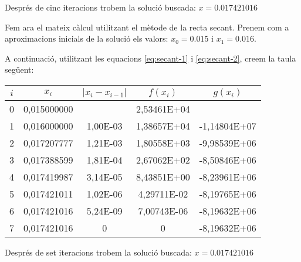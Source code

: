 \begin{exemple}
Després de cinc iteracions trobem la solució buscada: $x=\num{0,017421016}$

Fem ara el mateix càlcul utilitzant el mètode de la recta secant. Prenem com a  aproximacions inicials de la solució els valors: $x_0 = \num{0,015}$ i $x_1 = \num{0,016}$.

 A continuació, utilitzant les equacions \eqref{eq:secant-1} i \eqref{eq:secant-2}, creem la taula següent:

\begin{center}
   \centering
   \begin{tabular}{S[table-format=1.0]S[table-format=2.9]S[table-format=2.2e+2]
   S[table-format=2.5e+2]S[table-format=+3.5e+2]}
    & {$x_i$}  & {$|x_i - x_{i-1}|$} & {$f(x_i)$} & {$g(x_i)$} \\
   	&  0,015000000 & {}       & 2,53461E+04 & {}             \\
       1	&  0,016000000 & 1,00E-03 & 1,38657E+04 & -1,14804E+07 \\
       2	&  0,017207777 & 1,21E-03 & 1,80558E+03 & -9,98539E+06 \\
       3	&  0,017388599 & 1,81E-04 & 2,67062E+02 & -8,50846E+06 \\
       4	&  0,017419987 & 3,14E-05 & 8,43851E+00 & -8,23961E+06 \\
       5	&  0,017421011 & 1,02E-06 & 4,29711E-02 & -8,19765E+06 \\
       6	&  0,017421016 & 5,24E-09 & 7,00743E-06 & -8,19632E+06 \\
       7	&  0,017421016 & 0        & 0           & -8,19632E+06 \\
   \bottomrule[1pt]
   \end{tabular}
\end{center}


Després de set iteracions trobem la solució buscada: $x=\num{0,017421016}$


\end{exemple} 